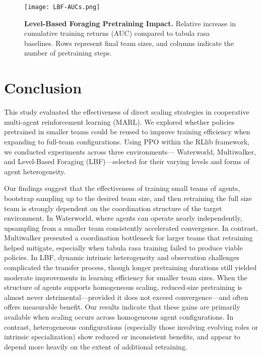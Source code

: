 \documentclass{article}
\begin{document}
\begin{figure}[h]
    \centering
    \texttt{[image: LBF-AUCs.png]}
    \caption{\textbf{Level-Based Foraging Pretraining Impact.} 
    Relative increase in cumulative training returns (AUC) compared to tabula rasa baselines. 
    Rows represent final team sizes, and columns indicate the number of pretraining steps.}
    \label{fig:lbf-aucs}
\end{figure}

\FloatBarrier

\section{Conclusion}
%
%
This study evaluated the effectiveness of direct scaling strategies in cooperative multi-agent 
reinforcement learning (MARL). We explored whether policies pretrained in smaller teams could 
be reused to improve training efficiency when expanding to full-team configurations. 
Using PPO within the RLlib framework, we conducted experiments across three environments—
Waterworld, Multiwalker, and Level-Based Foraging (LBF)—selected for their varying 
levels and forms of agent heterogeneity.

Our findings suggest that the effectiveness of training small teams of agents, bootstrap sampling 
up to the desired team size, and then retraining the full size team is strongly dependent on 
the coordination structure of the target environment. In Waterworld, where agents can operate 
nearly independently, upsampling from a smaller team consistently accelerated convergence. 
In contrast, Multiwalker presented a coordination bottleneck for larger teams that retraining 
helped mitigate, especially when tabula rasa training failed to produce viable policies. 
In LBF, dynamic intrinsic heterogeneity and observation challenges complicated the 
transfer process, though longer pretraining durations still yielded moderate 
improvements in learning efficiency for smaller team sizes.
When the structure of agents supports homogeneous scaling, reduced-size pretraining is almost 
never detrimental—provided it does not exceed convergence—and often offers measurable benefit. 
Our results indicate that these gains are primarily available when scaling occurs across 
homogeneous agent configurations. In contrast, heterogeneous configurations (especially those 
involving evolving roles or intrinsic specialization) show reduced or inconsistent benefits, 
and appear to depend more heavily on the extent of additional retraining.
\end{document}
